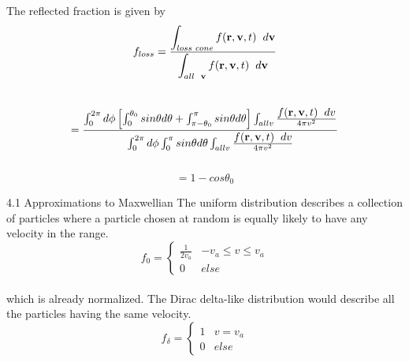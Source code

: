 \documentclass{beamer}
\begin{document}
	\begin{frame}
		
		The reflected fraction is given by 
		$$ f_{loss} = \frac{\displaystyle \int_{loss \hspace{0.1cm} cone}^{} f(\textbf{r}, \textbf{v}, t)  \hspace{0.2 cm} d \textbf{v}}{\displaystyle \int_{all \hspace{0.2 cm}\textbf{v}}^{} f(\textbf{r}, \textbf{v}, t) \hspace{0.2 cm} d \textbf{v}} $$\\ 
		$$ = \frac{\int_{0}^{2 \pi} d \phi \left[ \int_{0}^{\theta_{0}} sin \theta d \theta + \int_{\pi - \theta_{0}}^{\pi} sin \theta d \theta \right] \int_{all v}^{} \frac{\displaystyle  f(\textbf{r}, \textbf{v}, t)  \hspace{0.2 cm} dv}{4 \pi v^{2}}}{\int_{0}^{2 \pi} d \phi \int_{0}^{\pi} sin \theta d \theta \int_{all v}^{} \frac{\displaystyle  f(\textbf{r}, \textbf{v}, t)  \hspace{0.2 cm} dv}{4 \pi v^{2}}}$$ \\
		$$ = 1 - cos\theta_{0}$$
	\end{frame}

	\begin{frame}[t]{4.1 Approximations to Maxwellian}
			The uniform distribution describes a collection of particles where a particle chosen at random is equally likely to have any velocity in the range.
		\[ f_{0} = 
		\begin{cases} 
			\frac{1}{2 v_{a}} & -v_{a}\leq v\leq v_{a} \\
			0 & else 
		\end{cases}
		\] \\ which is already normalized. The Dirac delta-like distribution would describe all the particles having the same velocity.
		\[ f_{\delta} = 
		\begin{cases} 
			1 & v = v_{a} \\
			0 & else 
		\end{cases}
		\]
		
	\end{frame}
\end{document}

